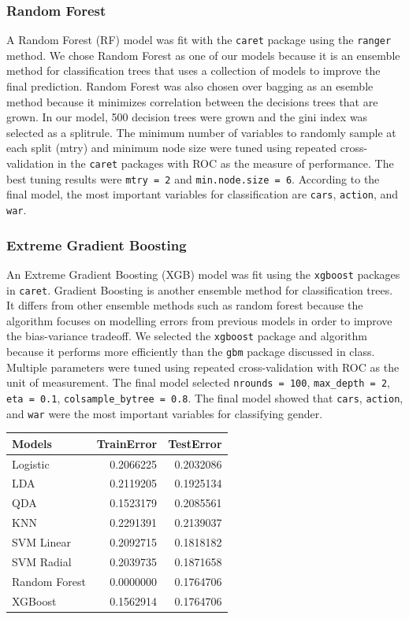 \documentclass[]{article}
\begin{document}
\subsubsection{Random Forest}\label{random-forest}

A Random Forest (RF) model was fit with the \texttt{caret} package using
the \texttt{ranger} method. We chose Random Forest as one of our models
because it is an ensemble method for classification trees that uses a
collection of models to improve the final prediction. Random Forest was
also chosen over bagging as an esemble method because it minimizes
correlation between the decisions trees that are grown. In our model,
500 decision trees were grown and the gini index was selected as a
splitrule. The minimum number of variables to randomly sample at each
split (mtry) and minimum node size were tuned using repeated
cross-validation in the \texttt{caret} packages with ROC as the measure
of performance. The best tuning results were \texttt{mtry\ =\ 2} and
\texttt{min.node.size\ =\ 6}. According to the final model, the most
important variables for classification are \texttt{cars},
\texttt{action}, and \texttt{war}.

\subsubsection{Extreme Gradient
Boosting}\label{extreme-gradient-boosting}

An Extreme Gradient Boosting (XGB) model was fit using the
\texttt{xgboost} packages in \texttt{caret}. Gradient Boosting is
another ensemble method for classification trees. It differs from other
ensemble methods such as random forest because the algorithm focuses on
modelling errors from previous models in order to improve the
bias-variance tradeoff. We selected the \texttt{xgboost} package and
algorithm because it performs more efficiently than the \texttt{gbm}
package discussed in class. Multiple parameters were tuned using
repeated cross-validation with ROC as the unit of measurement. The final
model selected \texttt{nrounds\ =\ 100}, \texttt{max\_depth\ =\ 2},
\texttt{eta\ =\ 0.1}, \texttt{colsample\_bytree\ =\ 0.8}. The final
model showed that \texttt{cars}, \texttt{action}, and \texttt{war} were
the most important variables for classifying gender.

\begin{longtable}[]{@{}lrr@{}}
\toprule
Models & TrainError & TestError\tabularnewline
\midrule
\endhead
Logistic & 0.2066225 & 0.2032086\tabularnewline
LDA & 0.2119205 & 0.1925134\tabularnewline
QDA & 0.1523179 & 0.2085561\tabularnewline
KNN & 0.2291391 & 0.2139037\tabularnewline
SVM Linear & 0.2092715 & 0.1818182\tabularnewline
SVM Radial & 0.2039735 & 0.1871658\tabularnewline
Random Forest & 0.0000000 & 0.1764706\tabularnewline
XGBoost & 0.1562914 & 0.1764706\tabularnewline
\bottomrule
\end{longtable}
\end{document}
